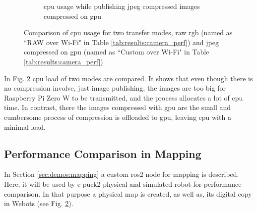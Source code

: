 \begin{figure}[H]
\begin{subfigure}{.8\textwidth}
  \caption{\ac{cpu} usage while publishing \ac{jpeg} compressed images compressed on \ac{gpu}}
  \label{fig:results:camera_load:jpeg_gpu}
\end{subfigure}
\caption[Comparison of \ac{cpu} usage for two transfer modes, raw \ac{rgb} and \ac{jpeg} compressed on \ac{gpu}]{Comparison of \ac{cpu} usage for two transfer modes, raw \ac{rgb} (named as ``RAW over Wi-Fi" in Table \ref{tab:results:camera_perf}) and \ac{jpeg} compressed on \ac{gpu} (named as ``Custom over Wi-Fi" in Table \ref{tab:results:camera_perf})}
\label{fig:results:camera_load}
\end{figure}

In Fig. \ref{fig:results:camera_load} \ac{cpu} load of two modes are compared.
It shows that even though there is no compression involve, just image publishing, the images are too big for Raspberry Pi Zero W to be transmitted, and the process allocates a lot of \ac{cpu} time.
In contrast, there the images compressed with \ac{gpu} are the small and cumbersome process of compression is offloaded to \ac{gpu}, leaving \ac{cpu} with a minimal load.

\subsection{Performance Comparison in Mapping}
In Section \ref{sec:demos:mapping} a custom \ac{ros2} node for mapping is described. Here, it will be used by e-puck2 physical and simulated robot for performance comparison. In that purpose a physical map is created, as well as, its digital copy in Webots (see Fig. \ref{fig:results:camera_load}).

